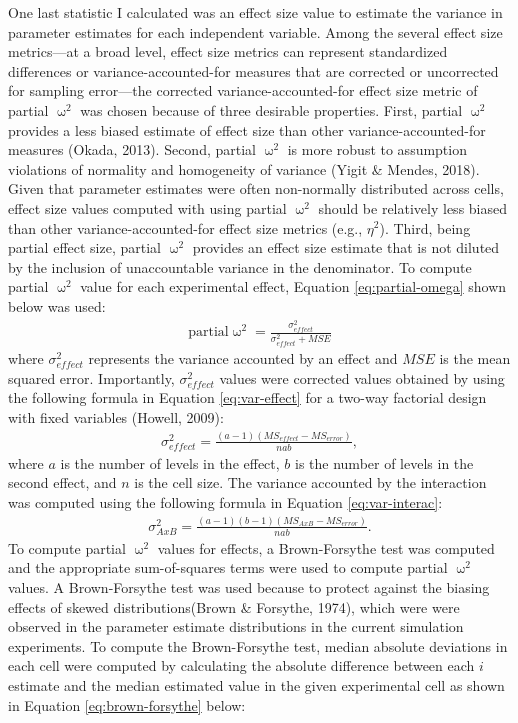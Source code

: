 \documentclass[
12pt, %
twoside,
english]{guelphthesis}
\theoremstyle{definition}
\theoremstyle{definition}
\theoremstyle{definition}
\theoremstyle{definition}
\theoremstyle{remark}
\begin{document}
One last statistic I calculated was an effect size value to estimate the variance in parameter estimates for each independent variable. Among the several effect size metrics---at a broad level, effect size
metrics can represent standardized differences or variance-accounted-for
measures that are corrected or uncorrected for sampling error---the corrected
variance-accounted-for effect size metric of partial \(\upomega^2\) was
chosen because of three desirable properties. First, partial
\(\upomega^2\) provides a less biased estimate of effect size than other
variance-accounted-for measures (Okada, 2013). Second, partial \(\upomega^2\) is more
robust to assumption violations of normality and homogeneity of variance
(Yigit \& Mendes, 2018). Given that parameter estimates were often non-normally distributed across cells, effect size values computed with using partial \(\upomega^2\) should be relatively less biased than
other variance-accounted-for effect size metrics (e.g., \(\eta^2\)). Third, being partial effect size, partial \(\upomega^2\) provides an effect size estimate that is not diluted by the inclusion of unaccountable variance in the denominator. To compute partial \(\upomega^2\) value for each experimental effect, Equation \ref{eq:partial-omega} shown below was used:
\begin{align}
\text{partial} \upomega^2 = \frac{\sigma^2_{effect}}{\sigma^2_{effect} + MSE} 
\label{eq:partial-omega}
\end{align}
\noindent where \(\sigma^2_{effect}\) represents the variance accounted by an effect and \(MSE\) is the mean squared error. Importantly, \(\sigma^2_{effect}\) values were corrected values obtained by using the following formula in Equation \ref{eq:var-effect} for a two-way factorial design with fixed variables (Howell, 2009):
\begin{align}
 \sigma^2_{effect} = \frac{(a - 1)(MS_{effect} - MS_{error})}{nab},
\label{eq:var-effect}
\end{align}
\noindent where \(a\) is the number of levels in the effect, \(b\) is the number of levels in the second effect, and \(n\) is the cell size. The variance accounted by the interaction was computed using the following formula in Equation \ref{eq:var-interac}:
\begin{align}
 \sigma^2_{A x B} = \frac{(a - 1)(b-1)(MS_{AxB} - MS_{error})}{nab}. 
\label{eq:var-interac}
\end{align}
To compute partial \(\upomega^2\) values for effects, a Brown-Forsythe test was computed and the appropriate
sum-of-squares terms were used to compute partial \(\upomega^2\) values. A Brown-Forsythe test was used because to protect against the biasing effects of skewed distributions(Brown \& Forsythe, 1974), which were were observed in the parameter estimate distributions in the current simulation experiments. To compute the Brown-Forsythe test, median absolute deviations in each cell were computed by calculating the absolute difference between each \(i\) estimate and the median estimated value in the given experimental cell as shown in Equation \ref{eq:brown-forsythe} below:
\end{document}
